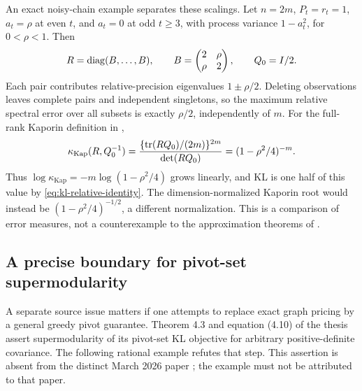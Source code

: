 An exact noisy-chain example separates these scalings. Let $n=2m$,
$P_t=r_t=1$, $a_t=\rho$ at even $t$, and $a_t=0$ at odd $t\ge3$,
with process variance $1-a_t^2$, for $0<\rho<1$. Then
\[
 R=\operatorname{diag}(B,\ldots,B),\qquad
 B=\begin{pmatrix}2&\rho\\\rho&2\end{pmatrix},\qquad Q_0=I/2.
\]
Each pair contributes relative-precision eigenvalues $1\pm\rho/2$.
Deleting observations leaves complete pairs and independent singletons,
so the maximum relative spectral error over all subsets is exactly
$\rho/2$, independently of $m$. For the full-rank Kaporin definition in
\citet[Definition 1.1]{KaminetzWebber2026},
\begin{equation}
 \kappa_{\mathrm{Kap}}(R,Q_0^{-1})
 =\frac{\{\operatorname{tr}(RQ_0)/(2m)\}^{2m}}{\det(RQ_0)}
 =(1-\rho^2/4)^{-m}.
 \label{eq:kaporin-pairs}
\end{equation}
Thus $\log\kappa_{\mathrm{Kap}}=-m\log(1-\rho^2/4)$ grows linearly,
and KL is one half of this value by \eqref{eq:kl-relative-identity}.
The dimension-normalized Kaporin root would instead be
$(1-\rho^2/4)^{-1/2}$, a different normalization. This is a comparison
of error measures, not a counterexample to the approximation theorems of
\citet{KaminetzWebber2026}.

\subsection{A precise boundary for pivot-set supermodularity}
\label{app:pivot-supermodularity}
A separate source issue matters if one attempts to replace exact graph
pricing by a general greedy pivot guarantee. Theorem 4.3 and equation (4.10)
of the thesis \citep{KaminetzThesis2025} assert supermodularity of its
pivot-set KL objective for arbitrary positive-definite covariance. The
following rational example refutes that step. This assertion is absent
from the distinct March 2026 paper \citep{KaminetzWebber2026}; the example
must not be attributed to that paper.

